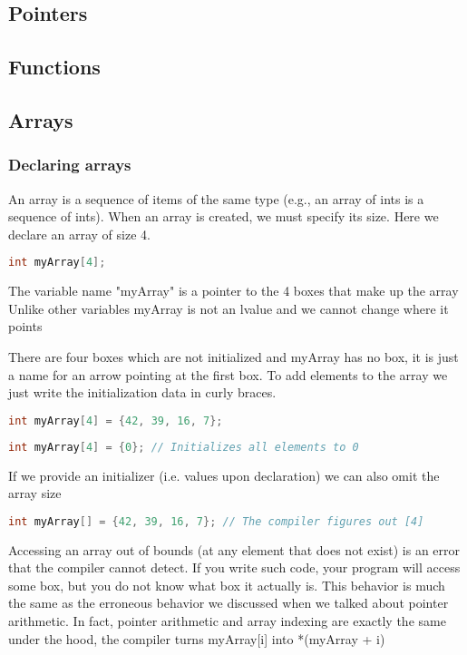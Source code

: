 \documentclass[12pt,a4paper]{article}
\begin{document}
\subsection{Pointers}


\subsection{Functions}

\subsection{Arrays}

\subsubsection{Declaring arrays}
An array is a sequence of items of the same type (e.g., an array of ints is 
a sequence of ints). When an array is created, we must specify its size.
Here we declare an array of size 4.

\begin{lstlisting}[language=C]
int myArray[4];
\end{lstlisting}

The variable name "myArray" is a pointer to the 4 boxes that make up the array
Unlike other variables myArray is not an lvalue and we cannot change where it
points

There are four boxes which are not initialized and myArray has no box, it is
just a name for an arrow pointing at the first box. To add elements to the
array we just write the initialization data in curly braces.

\begin{lstlisting}[language=C]
int myArray[4] = {42, 39, 16, 7};
\end{lstlisting}



\begin{lstlisting}[language=C]
int myArray[4] = {0}; // Initializes all elements to 0
\end{lstlisting}

If we provide an initializer (i.e. values upon declaration) we can also omit the
array size


\begin{lstlisting}[language=C]
int myArray[] = {42, 39, 16, 7}; // The compiler figures out [4]
\end{lstlisting}


 Accessing an array out of bounds (at any element that does not exist) is an 
 error that the compiler cannot detect. If you write such code, your program 
 will access some box, but you do not know what box it actually is. This 
 behavior is much the same as the erroneous behavior we discussed when we 
 talked about pointer arithmetic. In fact, pointer arithmetic and array 
 indexing are exactly the same under the hood, the compiler turns 
 myArray[i] into *(myArray + i)
\end{document}
